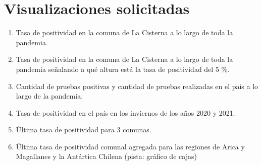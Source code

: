 \documentclass{article}
\begin{document}
\section{Visualizaciones solicitadas}

\begin{enumerate}
    \item Tasa de positividad en la comuna de La Cisterna a lo largo de toda la pandemia.
    \item Tasa de positividad en la comuna de La Cisterna a lo largo de toda la pandemia señalando a qué altura está la tasa de positividad del 5 \%.
    \item Cantidad de pruebas positivas y cantidad de pruebas realizadas en el país a lo largo de la pandemia.
    \item Tasa de positividad en el país en los inviernos de los años 2020 y 2021.
    \item Última tasa de positividad para 3 comunas.
    \item Última tasa de positividad comunal agregada para las regiones de Arica y Magallanes y la Antártica Chilena (pista: gráfico de cajas)
\end{enumerate}
\end{document}
